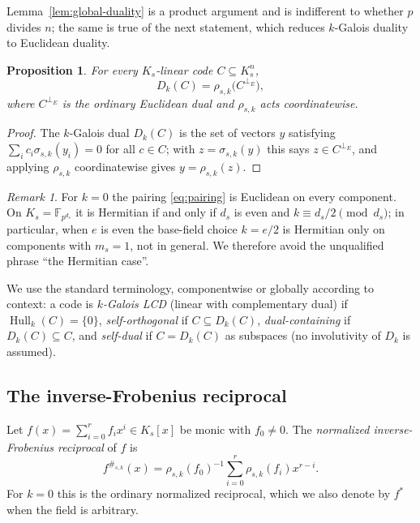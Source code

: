 \documentclass[preprint,12pt,a4paper]{elsarticle}
\newcommand{\F}{\mathbb F}
\newcommand{\Hull}{\operatorname{Hull}}
\newcommand{\Dk}{D_k}
\newcommand{\perpE}{\perp_{E}}
\newtheorem{proposition}[theorem]{Proposition}
\theoremstyle{definition}
\theoremstyle{remark}
\newtheorem{remark}[theorem]{Remark}
\begin{document}
Lemma~\ref{lem:global-duality} is a product argument and is indifferent to
whether $p$ divides $n$; the same is true of the next statement, which reduces
$k$-Galois duality to Euclidean duality.

\begin{proposition}\label{prop:dual-translation}
For every $K_s$-linear code $C\subseteq K_s^n$,
\[
\Dk(C)=\rho_{s,k}\bigl(C^{\perpE}\bigr),
\]
where $C^{\perpE}$ is the ordinary Euclidean dual and $\rho_{s,k}$ acts
coordinatewise.
\end{proposition}

\begin{proof}
The $k$-Galois dual $\Dk(C)$ is the set of vectors $y$ satisfying
$\sum_i c_i\sigma_{s,k}(y_i)=0$ for all $c\in C$; with
$z=\sigma_{s,k}(y)$ this says $z\in C^{\perpE}$, and applying
$\rho_{s,k}$ coordinatewise gives $y=\rho_{s,k}(z)$.
\end{proof}

\begin{remark}\label{rem:euclidean-hermitian}
For $k=0$ the pairing \eqref{eq:pairing} is Euclidean on every component.  On
$K_s=\F_{p^{d_s}}$ it is Hermitian if and only if $d_s$ is even and
$k\equiv d_s/2\pmod{d_s}$; in particular, when $e$ is even the base-field
choice $k=e/2$ is Hermitian only on components with $m_s=1$, not in general.
We therefore avoid the unqualified phrase ``the Hermitian case''.
\end{remark}

We use the standard terminology, componentwise or globally according to
context: a code is \emph{$k$-Galois LCD} (linear with complementary dual) if
$\Hull_k(C)=\{0\}$, \emph{self-orthogonal} if $C\subseteq\Dk(C)$,
\emph{dual-containing} if $\Dk(C)\subseteq C$, and \emph{self-dual} if
$C=\Dk(C)$ as subspaces (no involutivity of $\Dk$ is assumed).

\subsection{The inverse-Frobenius reciprocal}\label{sec:reciprocal}

Let $f(x)=\sum_{i=0}^{r}f_ix^i\in K_s[x]$ be monic with $f_0\neq0$.  The
\emph{normalized inverse-Frobenius reciprocal} of $f$ is
\begin{equation}\label{eq:reciprocal}
f^{\#_{s,k}}(x)
   =\rho_{s,k}(f_0)^{-1}\sum_{i=0}^{r}\rho_{s,k}(f_i)x^{r-i}.
\end{equation}
For $k=0$ this is the ordinary normalized reciprocal, which we also denote by
$f^\ast$ when the field is arbitrary.
\end{document}
